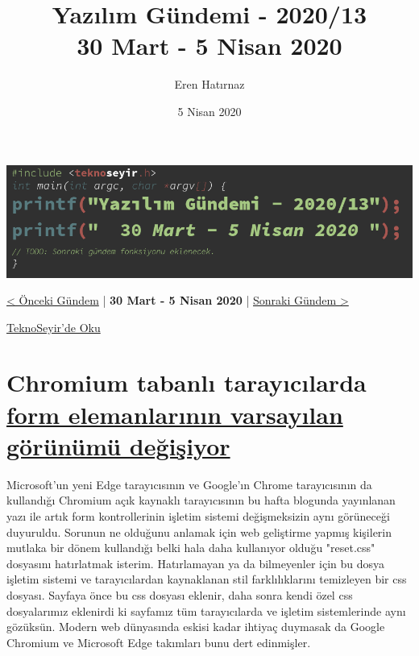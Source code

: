 \documentclass[11pt]{article}
\author{Eren Hatırnaz}
\date{5 Nisan 2020}
\title{Yazılım Gündemi - 2020/13\\\medskip
\large 30 Mart - 5 Nisan 2020}
\begin{document}
\maketitle
\tableofcontents \clearpage\shorthandoff{=}

\begin{center}
\includegraphics[width=.9\linewidth]{gorseller/yazilim-gundemi-banner.png}
\end{center}

\begin{center}
\href{../12/yazilim-gundemi-2020-12.pdf}{< Önceki Gündem} | \textbf{30 Mart - 5 Nisan 2020} | \href{../14/yazilim-gundemi-2020-14.pdf}{Sonraki Gündem >}

\href{https://teknoseyir.com/blog/yazilim-gundemi-2020-13}{TeknoSeyir'de Oku}
\end{center}

\section{Chromium tabanlı tarayıcılarda \href{https://blog.chromium.org/2020/03/updates-to-form-controls-and-focus.html}{form elemanlarının varsayılan görünümü değişiyor}}
\label{sec:org36bd09f}
Microsoft'un yeni Edge tarayıcısının ve Google'ın Chrome tarayıcısının da
kullandığı Chromium açık kaynaklı tarayıcısının bu hafta blogunda yayınlanan
yazı ile artık form kontrollerinin işletim sistemi değişmeksizin aynı
görüneceği duyuruldu. Sorunun ne olduğunu anlamak için web geliştirme yapmış
kişilerin mutlaka bir dönem kullandığı belki hala daha kullanıyor olduğu
"reset.css" dosyasını hatırlatmak isterim. Hatırlamayan ya da bilmeyenler için
bu dosya işletim sistemi ve tarayıcılardan kaynaklanan stil farklılıklarını
temizleyen bir css dosyası. Sayfaya önce bu css dosyası eklenir, daha sonra
kendi özel css dosyalarımız eklenirdi ki sayfamız tüm tarayıcılarda ve işletim
sistemlerinde aynı gözüksün. Modern web dünyasında eskisi kadar ihtiyaç
duymasak da Google Chromium ve Microsoft Edge takımları bunu dert edinmişler.
\end{document}

